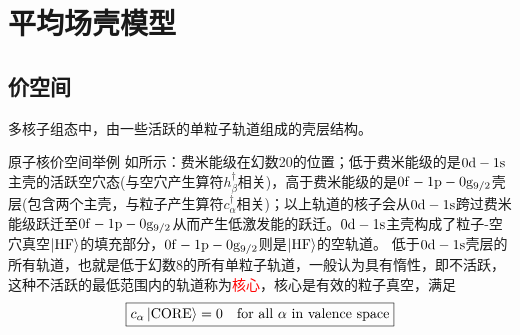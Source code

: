 \chapter{平均场壳模型}

\section{价空间}
\begin{definition}
    多核子组态中，由一些活跃的单粒子轨道组成的壳层结构。
\end{definition}
原子核价空间举例 如所示：费米能级在幻数20的位置；低于费米能级的是$0\rm{d}-1\rm{s}$主壳的活跃空穴态(与空穴产生算符$h_{\beta}^{\dagger}$相关)，高于费米能级的是$0\rm{f}-1\rm{p}-0\rm{g}_{9/2}$壳层(包含两个主壳，与粒子产生算符$c_{\alpha}^{\dagger}$相关)；以上轨道的核子会从$0\rm{d}-1\rm{s}$跨过费米能级跃迁至$0\rm{f}-1\rm{p}-0\rm{g}_{9/2}$从而产生低激发能的跃迁。$0\rm{d}-1\rm{s}$主壳构成了粒子-空穴真空$\ket{\rm{HF}}$的填充部分，$0\rm{f}-1\rm{p}-0\rm{g}_{9/2}$则是$\ket{\rm{HF}}$的空轨道。
低于$0\rm{d}-1\rm{s}$壳层的所有轨道，也就是低于幻数8的所有单粒子轨道，一般认为具有惰性，即不活跃，这种不活跃的最低范围内的轨道称为\textcolor{red}{核心}，核心是有效的粒子真空，满足
\begin{equation}
    \boxed{
    c_{\alpha} \ket{\rm{CORE}} = 0 \quad \text{for all $\alpha$ in valence space}
    }
\end{equation}
